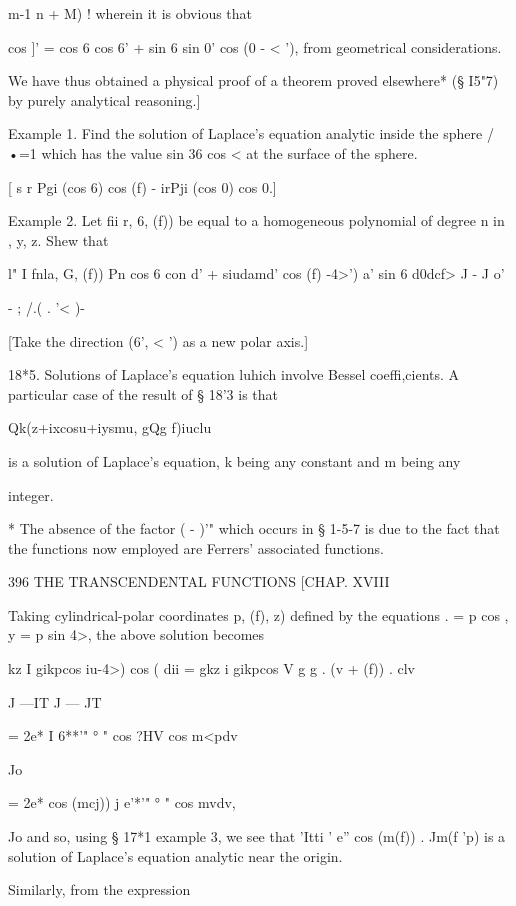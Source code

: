 m-1  n + M) ! 
wherein it is obvious that 

cos  ]' = cos 6 cos 6' + sin 6 sin 0' cos (0 - < '), 
from geometrical considerations. 

We have thus obtained a physical proof of a theorem proved elsewhere* (§ I5"7) by 
purely analytical reasoning.] 

Example 1. Find the solution of Laplace's equation analytic inside the sphere /•=1 
which has the value sin 36 cos <  at the surface of the sphere. 

[ s r Pgi (cos 6) cos (f) - irPji (cos 0) cos 0.] 

Example 2. Let fii r, 6, (f)) be equal to a homogeneous polynomial of degree n 
in  , y, z. Shew that 

l" I fnla, G, (f)) Pn  cos 6 con d' + siudamd' cos  (f) -4>')  a'  sin 6 d0dcf> 
J -  J o' 

- ; /.( . '< )- 

[Take the direction (6', < ') as a new polar axis.] 

18*5. Solutions of Laplace's equation luhich involve Bessel coeffi,cients. 
A particular case of the result of § 18'3 is that 



Qk(z+ixcosu+iysmu, gQg f)iuclu 

is a solution of Laplace's equation, k being any constant and m being any 

integer. 

* The absence of the factor ( - )'"  which occurs in § 1-5-7 is due to the fact that the functions 
now employed are Ferrers' associated functions. 



396 THE TRANSCENDENTAL FUNCTIONS [CHAP. XVIII 

Taking cylindrical-polar coordinates  p, (f), z) defined by the equations 
.   = p cos  , y = p sin 4>, 
the above solution becomes 

 kz I gikpcos iu-4>) cos  (   dii = gkz i gikpcos V g g .   (v + (f)) . clv 

J —IT J — JT 

= 2e*  I 6**'" °  " cos ?HV cos m<pdv 

Jo 

= 2e*  cos (mcj)) j e'*'" °  " cos mvdv, 

Jo 
and so, using § 17*1 example 3, we see that 'Itti '  e''  cos (m(f)) . Jm(f 'p) is a 
solution of Laplace's equation analytic near the origin. 

Similarly, from the expression 

